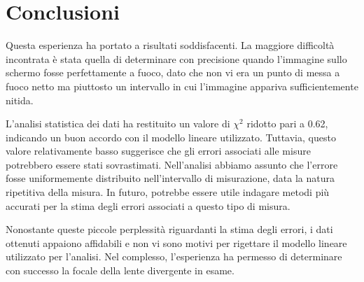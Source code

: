 \documentclass{article}
\begin{document}
\section{Conclusioni}

Questa esperienza ha portato a risultati soddisfacenti. La maggiore difficoltà incontrata è stata quella di determinare con precisione quando l'immagine sullo schermo fosse perfettamente a fuoco, dato che non vi era un punto di messa a fuoco netto ma piuttosto un intervallo in cui l'immagine appariva sufficientemente nitida. 

L'analisi statistica dei dati ha restituito un valore di $\chi^2$ ridotto pari a 0.62, indicando un buon accordo con il modello lineare utilizzato. Tuttavia, questo valore relativamente basso suggerisce che gli errori associati alle misure potrebbero essere stati sovrastimati. Nell'analisi abbiamo assunto che l'errore fosse uniformemente distribuito nell'intervallo di misurazione, data la natura ripetitiva della misura. In futuro, potrebbe essere utile indagare metodi più accurati per la stima degli errori associati a questo tipo di misura.

Nonostante queste piccole perplessità riguardanti la stima degli errori, i dati ottenuti appaiono affidabili e non vi sono motivi per rigettare il modello lineare utilizzato per l'analisi. Nel complesso, l'esperienza ha permesso di determinare con successo la focale della lente divergente in esame.




\pagebreak
\end{document}
